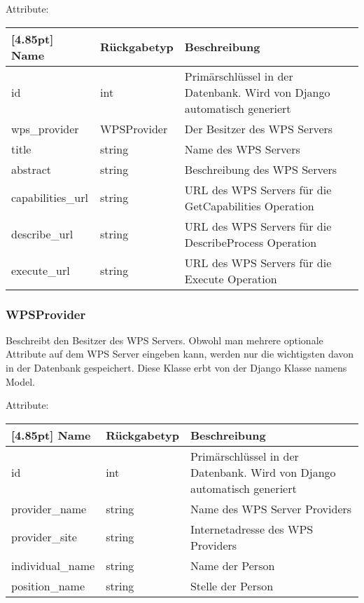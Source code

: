			Attribute:
			\begin{center}
				\setlength\tabcolsep{5pt}
				\renewcommand{\arraystretch}{1.5}
				
				\begin{tabularx}{\textwidth}{|l|l|X|}
					\hline
					\rowcolor[gray]{0.75}[4.85pt]
					Name & Rückgabetyp & Beschreibung \\ \hline 
					id & int & Primärschlüssel in der Datenbank. Wird von Django automatisch generiert \\ \hline
					wps\_provider & WPSProvider & Der Besitzer des WPS Servers \\ \hline
					title & string & Name des WPS Servers \\ \hline
					abstract & string & Beschreibung des WPS Servers \\ \hline
					capabilities\_url & string & URL des WPS Servers für die GetCapabilities Operation \\ \hline
					describe\_url & string & URL des WPS Servers für die DescribeProcess Operation \\ \hline
					execute\_url & string & URL des WPS Servers für die Execute Operation \\ \hline
					
				\end{tabularx}
			\end{center}

\newpage

		\subsubsection{WPSProvider}
			Beschreibt den Besitzer des WPS Servers. Obwohl man mehrere optionale Attribute auf dem WPS Server eingeben kann, werden nur die wichtigsten davon in der Datenbank gespeichert. \newline
			Diese Klasse erbt von der Django Klasse namens \glqq Model\grqq .\newline
			
			Attribute:
			\begin{center}
				\setlength\tabcolsep{5pt}
				\renewcommand{\arraystretch}{1.5}
				
				\begin{tabularx}{\textwidth}{|l|l|X|}
					\hline
					\rowcolor[gray]{0.75}[4.85pt]
					Name & Rückgabetyp & Beschreibung \\ \hline 
					id & int & Primärschlüssel in der Datenbank. Wird von Django automatisch generiert \\ \hline
					provider\_name & string & Name des WPS Server Providers\\ \hline
					provider\_site & string & Internetadresse des WPS Providers \\ \hline
					individual\_name & string & Name der Person\\ \hline
					position\_name & string & Stelle der Person \\ \hline
				\end{tabularx}
			\end{center}

